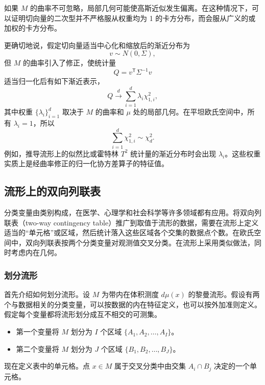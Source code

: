 如果 $M$ 的曲率不可忽略，局部几何可能使高斯近似发生偏离。在这种情况下，可以证明切向量的二次型并不严格服从权重均为 1 的卡方分布，而会服从广义的或加权的卡方分布。

更确切地说，假定切向量适当中心化和缩放后的渐近分布为
\[
  v\sim N(0,\Sigma),
\]
但 $M$ 的曲率引入了修正，使统计量
\[
  Q=v^{\mathsf T}\Sigma^{-1}v
\]
适当归一化后有如下渐近表示，
\begin{equation*}
  Q\xrightarrow{d}\sum_{i=1}^d\lambda_i\chi_{1,i}^2,
  \tag{6.32}\label{eq:6.32}
\end{equation*}
其中权重 $\{\lambda_i\}_{i=1}^d$ 取决于 $M$ 的曲率和 $\mu$ 处的局部几何。在平坦欧氏空间中，所有 $\lambda_i=1$，所以
\begin{equation*}
  \sum_{i=1}^d\chi_{1,i}^2\sim\chi_d^2.
  \tag{6.33}\label{eq:6.33}
\end{equation*}
例如，推导流形上的似然比或霍特林 $T^2$ 统计量的渐近分布时会出现 $\lambda_i$。这些权重实质上是经曲率修正的归一化协方差算子的特征值。

\subsection{流形上的双向列联表}

分类变量由类别构成，在医学、心理学和社会科学等许多领域都有应用。将双向列联表（two-way contingency table）推广到取值于流形的数据，需要在流形上定义适当的“单元格”或区域，然后统计落入这些区域各个交集的数据点个数。在欧氏空间中，双向列联表按两个分类变量对观测值交叉分类。在流形上采用类似做法，同时考虑内在几何。

\subsubsection{划分流形}

首先介绍如何划分流形。设 $M$ 为带内在体积测度 $d\mu(x)$ 的黎曼流形。假设有两个与数据相关的分类变量，可以按数据的内在特征定义，也可以按外加准则定义。假定每个变量都将流形划分成互不相交的可测集。
\begin{itemize}
  \item 第一个变量将 $M$ 划分为 $I$ 个区域 $\{A_1,A_2,\ldots,A_I\}$。
  \item 第二个变量将 $M$ 划分为 $J$ 个区域 $\{B_1,B_2,\ldots,B_J\}$。
\end{itemize}
现在定义表中的单元格。点 $x\in M$ 属于交叉分类中由交集 $A_i\cap B_j$ 决定的一个单元格。


